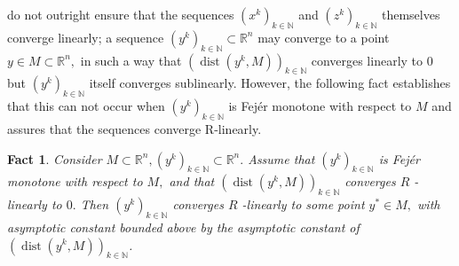 \documentclass[smallextended,numbook,nospthms]{svjour3}
\theoremstyle{plain}
\newtheorem{fact}[theorem]{Fact}
\theoremstyle{definition}
\def\RR{\mathds R}
\def\NN{\mathds N}
\DeclareMathOperator{\dist}{dist}
\begin{document}
 do not outright ensure that the sequences $\left(x^{k}\right)_{k \in \NN}$ and $\left(z^{k}\right)_{k \in \NN}$ themselves converge linearly; a sequence $\left(y^{k}\right)_{k \in \NN} \subset \RR^{n}$ may converge to a point $y \in M \subset \RR^{n},$ in such a way that $\left(\dist\left(y^{k}, M\right)\right)_{k \in \NN}$ converges linearly to 0 but $\left(y^{k}\right)_{k \in \NN}$ itself converges sublinearly. However, the following fact establishes that this can not occur when $\left(y^{k}\right)_{k \in \NN}$ is Fejér monotone with respect to $M$ and assures that the sequences converge R-linearly.

\begin{fact}\label{fact:lemma EB conv}
	Consider $M \subset \RR^{n},\left(y^{k}\right)_{k \in \NN} \subset \RR^{n} .$ Assume that $\left(y^{k}\right)_{k \in \NN}$ is Fejér monotone with respect to $M,$ and that $\left(\operatorname{dist}\left(y^{k}, M\right)\right)_{k \in \NN}$ converges $R$ -linearly to $0 .$ Then $\left(y^{k}\right)_{k \in \NN}$ converges $R$ -linearly to some point $y^{*} \in M,$ with asymptotic constant bounded above by the asymptotic constant of $\left(\operatorname{dist}\left(y^{k}, M\right)\right)_{k \in \NN}$.
\end{fact}
\end{document}
